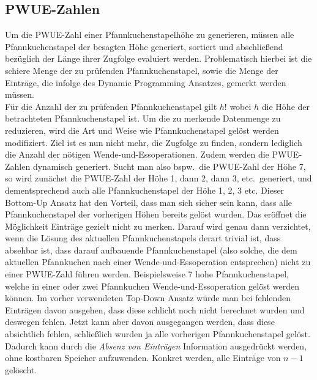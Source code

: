 \subsection{PWUE-Zahlen}\label{subsec:pwue-zahlen}
Um die PWUE-Zahl einer Pfannkuchenstapelhöhe zu generieren, müssen alle Pfannkuchenstapel der besagten Höhe generiert,
sortiert und abschlie{\ss}end bezüglich der Länge ihrer Zugfolge evaluiert werden.
Problematisch hierbei ist die schiere Menge der zu prüfenden Pfannkuchenstapel, sowie die Menge der Einträge, die
infolge des Dynamic Programming Ansatzes, gemerkt werden müssen. \\
Für die Anzahl der zu prüfenden Pfannkuchenstapel gilt $h!$ wobei $h$ die Höhe der betrachteten Pfannkuchenstapel ist.
Um die zu merkende Datenmenge zu reduzieren, wird die Art und Weise wie Pfannkuchenstapel gelöst werden modifiziert.
Ziel ist es nun nicht mehr, die Zugfolge zu finden, sondern lediglich die Anzahl der nötigen Wende-und-Essoperationen.
Zudem werden die PWUE-Zahlen dynamisch generiert.
Sucht man also bspw.\ die PWUE-Zahl der Höhe 7, so wird zunächst die PWUE-Zahl der Höhe 1, dann 2, dann 3, etc.\ generiert,
und dementsprechend auch alle Pfannkuchenstapel der Höhe 1, 2, 3 etc.
Dieser Bottom-Up Ansatz hat den Vorteil, dass man sich sicher sein kann, dass alle Pfannkuchenstapel der vorherigen
Höhen bereits gelöst wurden.
Das eröffnet die Möglichkeit Einträge gezielt nicht zu merken.
Darauf wird genau dann verzichtet, wenn die Lösung des aktuellen Pfannkuchenstapels derart trivial ist, dass absehbar ist, dass
darauf aufbauende Pfannkuchenstapel (also solche, die dem aktuellen Pfannkuchen nach einer Wende-und-Essoperation entsprechen)
nicht zu einer PWUE-Zahl führen werden.
Beispielsweise 7 hohe Pfannkuchenstapel, welche in einer oder zwei Pfannkuchen Wende-und-Essoperation gelöst werden können.
Im vorher verwendeten Top-Down Ansatz würde man bei fehlenden Einträgen davon ausgehen, dass diese schlicht noch nicht
berechnet wurden und deswegen fehlen.
Jetzt kann aber davon ausgegangen werden, dass diese absichtlich fehlen,
schlie{\ss}lich wurden ja alle vorherigen Pfannkuchenstapel gelöst.
Dadurch kann durch die \textit{Absenz von Einträgen} Information ausgedrückt werden, ohne kostbaren Speicher aufzuwenden.
Konkret werden, alle Einträge von $n - 1$ gelöscht.
